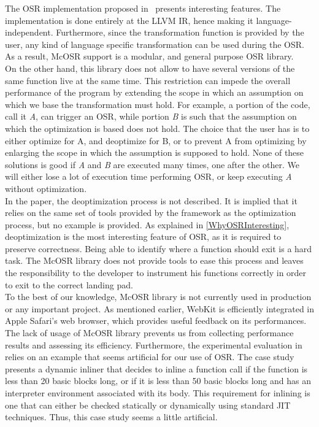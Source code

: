 The OSR implementation proposed in~\cite{lameed2013modular} presents interesting features.
The implementation is done entirely at the LLVM IR, hence making it language-independent.
Furthermore, since the transformation function is provided by the user, any kind of language specific transformation can be used during the OSR.
As a result, McOSR support is a modular, and general purpose OSR library.\\

On the other hand, this library does not allow to have several versions of the same function live at the same time.
This restriction can impede the overall performance of the program by extending the scope in which an assumption on which we base the transformation must hold.
For example, a portion of the code, call it \textit{A}, can trigger an OSR, while portion \textit{B} is such that the assumption on which the optimization is based does not hold.
The choice that the user has is to either optimize for A, and deoptimize for B, or to prevent A from optimizing by enlarging the scope in which the assumption is supposed to hold.
None of these solutions is good if \textit{A} and \textit{B} are executed many times, one after the other.
We will either lose a lot of execution time performing OSR, or keep executing \textit{A} without optimization.\\

In the paper, the deoptimization process is not described. 
It is implied that it relies on the same set of tools provided by the framework as the optimization process, but no example is provided.
As explained in \ref{WhyOSRInteresting}, deoptimization is the most interesting feature of OSR, as it is required to preserve correctness.
Being able to identify where a function should exit is a hard task.
The McOSR library does not provide tools to ease this process and leaves the responsibility to the developer to instrument his functions correctly in order to exit to the correct landing pad.\\

To the best of our knowledge, McOSR library is not currently used in production or any important project.
As mentioned earlier, WebKit is efficiently integrated in Apple Safari's web browser, which provides useful feedback on its performances.
The lack of usage of McOSR library prevents us from collecting performance results and assessing its efficiency.
Furthermore, the experimental evaluation in~\cite{lameed2013modular} relies on an example that seems artificial for our use of OSR. 
The case study presents a dynamic inliner that decides to inline a function call if the function is less than 20 basic blocks long, or if it is less than 50 basic blocks long and has an interpreter environment associated with its body. 
This requirement for inlining is one that can either be checked statically or dynamically using standard JIT techniques. 
Thus, this case study seems a little artificial.\\

